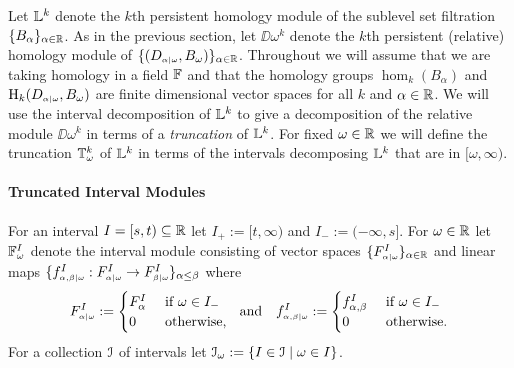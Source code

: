 Let $\mathbb{L}^k$ denote the $k$th persistent homology module of the sublevel set filtration $\{B_\alpha\}_{\alpha\in\mathbb{R}}$.
As in the previous section, let $\DD{\omega}^k$ denote the $k$th persistent (relative) homology module of $\{(D_{\scriptscriptstyle \alpha\mid \omega}, B_\omega)\}_{\alpha\in\mathbb{R}}$.
Throughout we will assume that we are taking homology in a field $\mathbb{F}$ and that the homology groups $\hom_k(B_\alpha)$ and $\mathrm{H}_k(D_{\scriptscriptstyle \alpha\mid \omega}, B_\omega)$ are finite dimensional vector spaces for all $k$ and $\alpha\in\mathbb{R}$.
We will use the interval decomposition of $\mathbb{L}^k$ to give a decomposition of the relative module $\DD{\omega}^k$ in terms of a \emph{truncation} of $\mathbb{L}^k$.
For fixed $\omega\in\mathbb{R}$ we will define the truncation $\mathbb{T}^k_\omega$ of $\mathbb{L}^k$ in terms of the intervals decomposing $\mathbb{L}^k$ that are in $[\omega, \infty)$.

\paragraph*{Truncated Interval Modules}

For an interval $I = [s,t)\subseteq \mathbb{R}$ let $I_+ := [t,\infty)$ and $I_- := (-\infty, s]$.
For $\omega\in\mathbb{R}$ let $\mathbb{F}_{\omega}^I$ denote the interval module consisting of vector spaces $\{F_{\scriptscriptstyle \alpha\mid \omega}^I\}_{\alpha\in\mathbb{R}}$ and linear maps $\{f_{\scriptscriptstyle \alpha,\beta\mid \omega}^I : F_{\scriptscriptstyle \alpha\mid \omega}^I\to F_{\scriptscriptstyle \beta\mid \omega}^I\}_{\alpha\leq\beta}$ where
\[ F_{\scriptscriptstyle \alpha\mid \omega}^I := \begin{cases} F_\alpha^I&\text{ if } \omega\in I_-\\ 0&\text{ otherwise,}\end{cases}\ \text{ and }\ \ f_{\scriptscriptstyle \alpha,\beta\mid \omega}^I := \begin{cases} f_{\alpha,\beta}^I&\text{ if } \omega\in I_-\\ 0&\text{ otherwise.}\end{cases}\]
For a collection ${\mathcal{I}}$ of intervals let ${\mathcal{I}}_\omega := \{I\in{\mathcal{I}}\mid \omega\in I\}$.

